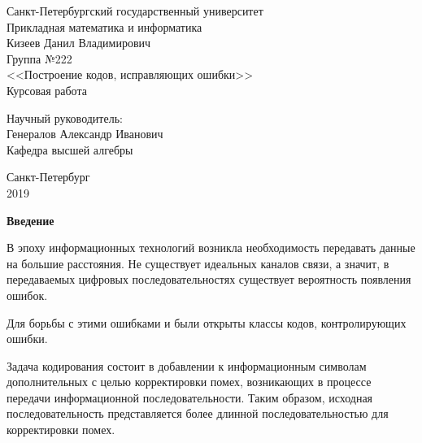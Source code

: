 \documentclass{article}
\begin{document}
    \begin{center}
        \hfill \break 
        \large{Санкт-Петербургский государственный университет} \\
        \large{Прикладная математика и информатика} \\
        \hfill \break
        \hfill\break
        \hfill \break
        \hfill \break
        \hfill \break      
        \large{Кизеев Данил Владимирович} \\
        \large{Группа №222} \\
        \hfill \break
        \hfill \break
        \hfill \break  
        \large{<<Построение кодов, исправляющих ошибки>>\ } \\
        \hfill \break
        \hfill \break
        \large{Курсовая работа}
    \end{center}
    \hfill \break
    \hfill \break
    \hfill \break
    \hfill \break
    
    \begin{flushright}
        \large{Научный руководитель:} \\
        \large{Генералов Александр Иванович} \\
        \large{Кафедра высшей алгебры}\\
    \end{flushright}
    \hfill \break
    \hfill \break
    
    \begin{center}
        \large{Санкт-Петербург} \\
        \large{2019}\\
    \end{center}
    \thispagestyle{empty}   %
    
    \newpage
        \begin{center}
            \large \textbf{Введение}
        \end{center}
            \hfill \break
            \hfill \break
            В эпоху информационных технологий возникла необходимость передавать данные на большие расстояния. Не существует идеальных каналов связи, а значит, в передаваемых цифровых последовательностях существует вероятность появления ошибок.    
            
            Для борьбы с этими ошибками и были открыты классы кодов, контролирующих ошибки.
             
            Задача кодирования состоит в добавлении к информационным символам дополнительных с целью корректировки помех, возникающих в процессе передачи информационной последовательности.
            Таким образом, исходная последовательность представляется более длинной последовательностью для корректировки помех.
            
\end{document}
